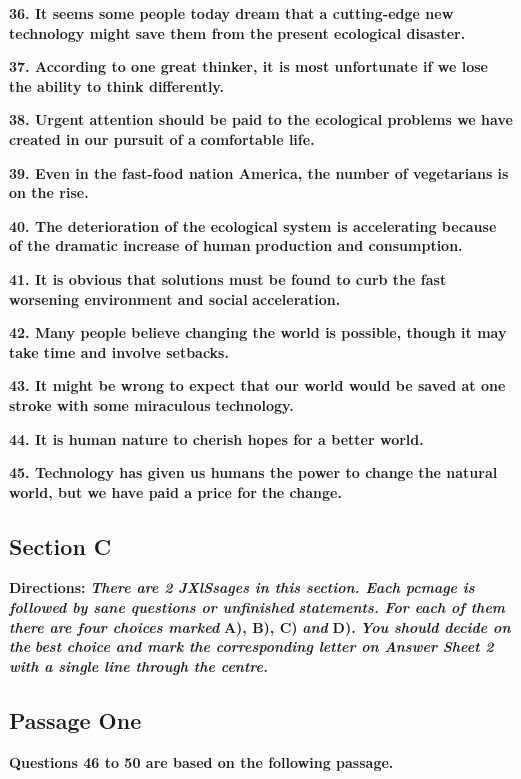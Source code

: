 \documentclass[UTF8,11pt]{ctexart}
\begin{document}
\textbf{36. It seems some people today dream that a cutting-edge new technology might save them from the} \textbf{present ecological disaster.}


\textbf{37. According to one great thinker, it is most unfortunate if we lose the ability to think differently.}


\textbf{38. Urgent attention should be paid to the ecological problems we have created in our pursuit of a} \textbf{comfortable life.}


\textbf{39. Even in the fast-food nation America, the number of vegetarians is on the rise.}


\textbf{40. The deterioration of the ecological system is accelerating because of the dramatic increase of human} \textbf{production and consumption.}


\textbf{41. It is obvious that solutions must be found to curb the fast worsening environment and social} \textbf{acceleration.}


\textbf{42. Many people believe changing the world is possible, though it may take time and involve setbacks.}


\textbf{43. It might be wrong to expect that our world would be saved at one stroke with some miraculous} \textbf{technology.}


\textbf{44. It is human nature to cherish hopes for a better world.}


\textbf{45. Technology has given us humans the power to change the natural world, but we have paid a price for} \textbf{the change.}


\subsection*{\textbf{Section C}}


\textbf{Directions: }\textbf{\textit{There are 2 JXlSsages in this section. Each pcmage is followed by sane questions or unfinished}} \textbf{\textit{statements. For each of them there are four choices marked }}\textbf{A), B), C) }\textbf{\textit{and }}\textbf{D). }\textbf{\textit{You should decide on the}} \textbf{\textit{best choice and mark the corresponding letter on Answer Sheet 2 with a single line through the centre.}}


\subsection*{\textbf{Passage One}}


\textbf{Questions 46 to 50 are based on the following passage.}
\end{document}
